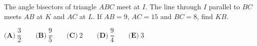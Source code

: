 The angle bisectors of triangle $ABC$ meet at $I$. The line through $I$ parallel to $BC$ meets $AB$ at $K$ and $AC$ at $L$. If $AB=9$, $AC=15$ and $BC=8$, find $KB$.

$\textbf{(A)}\ \dfrac{3}{2}\qquad\textbf{(B)}\ \dfrac{9}{5}\qquad\textbf{(C)}\ 2\qquad\textbf{(D)}\ \dfrac{9}{4}\qquad\textbf{(E)}\ 3$
